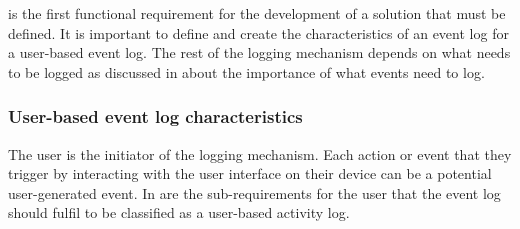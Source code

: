  is the first functional requirement for the development of a solution that must be defined. It is important to define and create the characteristics of an event log for a user-based event log. The rest of the logging mechanism depends on what needs to be logged as discussed in  about the importance of what events need to log. 

\subsubsection{User-based event log characteristics}\label{sec:ch2_requirementsOfUAT}
The user is the initiator of the logging mechanism. Each action or event that they trigger by interacting with the user interface on their device can be a potential user-generated event. In  are the sub-requirements for the user that the event log should fulfil to be classified as a user-based activity log.

